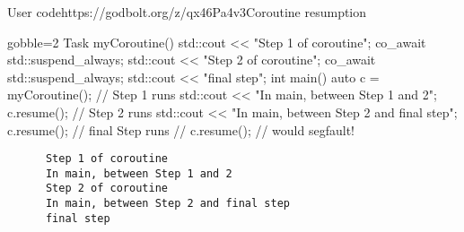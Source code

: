 \begin{frame}[fragile]
  \scriptsize
  \begin{exampleblockGB}{User code}{https://godbolt.org/z/qx46Pa4v3}{Coroutine resumption}
    \begin{cppcode*}{gobble=2}
      Task myCoroutine() {
        std::cout << "Step 1 of coroutine\n";
        co_await std::suspend_always{};
        std::cout << "Step 2 of coroutine\n";
        co_await std::suspend_always{};
        std::cout << "final step\n";
      }
      int main() {
        auto c = myCoroutine(); // Step 1 runs
        std::cout << "In main, between Step 1 and 2\n";
        c.resume();             // Step 2 runs
        std::cout << "In main, between Step 2 and final step\n";
        c.resume();             // final Step runs
        // c.resume(); // would segfault!
      }
    \end{cppcode*}
  \end{exampleblockGB}
  \begin{block}{}
    \begin{verbatim}
      Step 1 of coroutine
      In main, between Step 1 and 2
      Step 2 of coroutine
      In main, between Step 2 and final step
      final step
    \end{verbatim}
  \end{block}
\end{frame}

